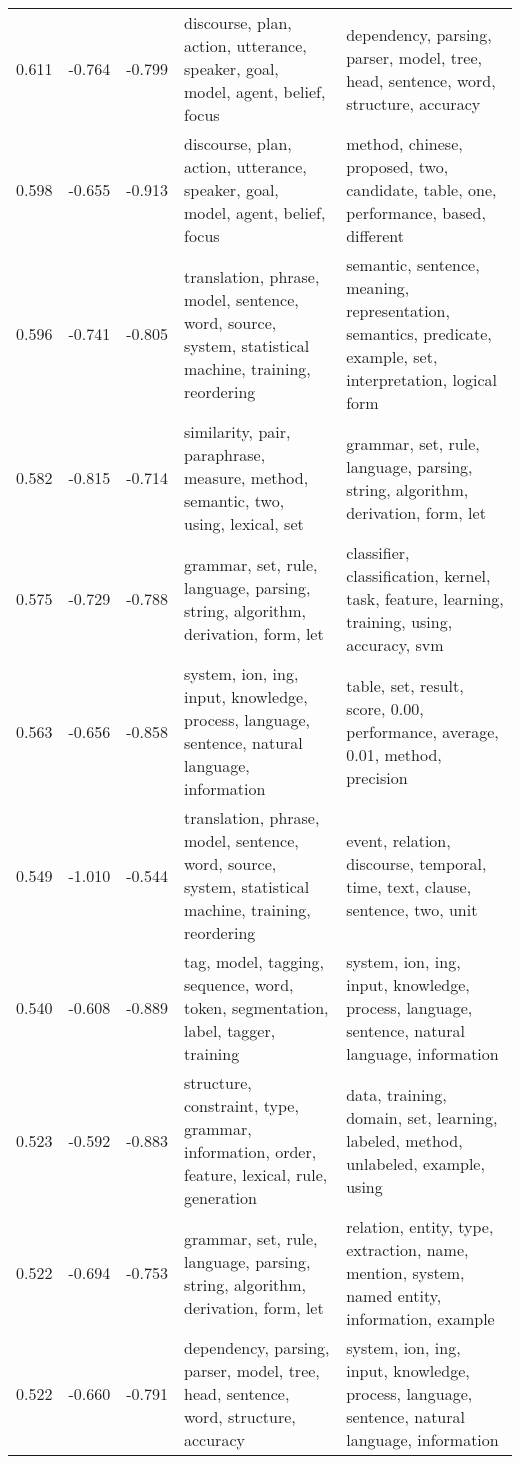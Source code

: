 \begin{tabular}{cccp{5cm}p{5cm}}
0.611 & -0.764 & -0.799 & discourse, plan, action, utterance, speaker, goal, model, agent, belief, focus & dependency, parsing, parser, model, tree, head, sentence, word, structure, accuracy \\
0.598 & -0.655 & -0.913 & discourse, plan, action, utterance, speaker, goal, model, agent, belief, focus & method, chinese, proposed, two, candidate, table, one, performance, based, different \\
0.596 & -0.741 & -0.805 & translation, phrase, model, sentence, word, source, system, statistical machine, training, reordering & semantic, sentence, meaning, representation, semantics, predicate, example, set, interpretation, logical form \\
0.582 & -0.815 & -0.714 & similarity, pair, paraphrase, measure, method, semantic, two, using, lexical, set & grammar, set, rule, language, parsing, string, algorithm, derivation, form, let \\
0.575 & -0.729 & -0.788 & grammar, set, rule, language, parsing, string, algorithm, derivation, form, let & classifier, classification, kernel, task, feature, learning, training, using, accuracy, svm \\
0.563 & -0.656 & -0.858 & system, ion, ing, input, knowledge, process, language, sentence, natural language, information & table, set, result, score, 0.00, performance, average, 0.01, method, precision \\
0.549 & -1.010 & -0.544 & translation, phrase, model, sentence, word, source, system, statistical machine, training, reordering & event, relation, discourse, temporal, time, text, clause, sentence, two, unit \\
0.540 & -0.608 & -0.889 & tag, model, tagging, sequence, word, token, segmentation, label, tagger, training & system, ion, ing, input, knowledge, process, language, sentence, natural language, information \\
0.523 & -0.592 & -0.883 & structure, constraint, type, grammar, information, order, feature, lexical, rule, generation & data, training, domain, set, learning, labeled, method, unlabeled, example, using \\
0.522 & -0.694 & -0.753 & grammar, set, rule, language, parsing, string, algorithm, derivation, form, let & relation, entity, type, extraction, name, mention, system, named entity, information, example \\
0.522 & -0.660 & -0.791 & dependency, parsing, parser, model, tree, head, sentence, word, structure, accuracy & system, ion, ing, input, knowledge, process, language, sentence, natural language, information \\

\end{tabular}

